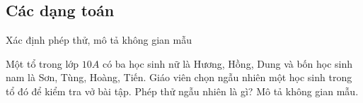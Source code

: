 \subsection{Các dạng toán}
\begin{dang}{Xác định phép thử, mô tả không gian mẫu}
	
\end{dang}
\viduminhhoa
\begin{vd}%
	Một tổ trong lớp $ 10A $ có ba học sinh nữ là Hương, Hồng, Dung và bốn học sinh nam là Sơn, Tùng, Hoàng, Tiến. Giáo viên chọn ngẫu nhiên một học sinh trong tổ đó để kiểm tra vở bài tập. Phép thử ngẫu nhiên là gì? Mô tả không gian mẫu.
\end{vd}
